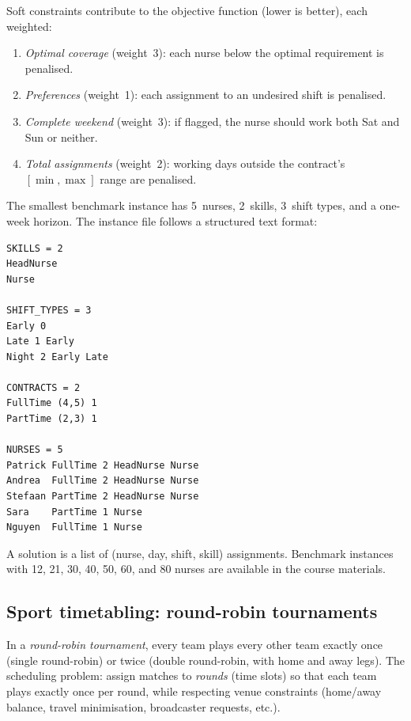 \noindent
Soft constraints contribute to the objective function
(lower is better), each weighted:
\begin{enumerate}[nosep]
  \item[S1.] \emph{Optimal coverage} (weight~3):
             each nurse below the optimal requirement is penalised.
  \item[S2.] \emph{Preferences} (weight~1):
             each assignment to an undesired shift is penalised.
  \item[S3.] \emph{Complete weekend} (weight~3):
             if flagged, the nurse should work both Sat and Sun or
             neither.
  \item[S4.] \emph{Total assignments} (weight~2):
             working days outside the contract's $[\min, \max]$
             range are penalised.
\end{enumerate}

\begin{example}
\label{ex:nr-05}
The smallest benchmark instance has 5~nurses, 2~skills, 3~shift
types, and a one-week horizon.  The instance file follows a
structured text format:

\begin{lstlisting}[language={}, numbers=none,
  caption={Excerpt from the NR-05 instance file.}]
SKILLS = 2
HeadNurse
Nurse

SHIFT_TYPES = 3
Early 0
Late 1 Early
Night 2 Early Late

CONTRACTS = 2
FullTime (4,5) 1
PartTime (2,3) 1

NURSES = 5
Patrick FullTime 2 HeadNurse Nurse
Andrea  FullTime 2 HeadNurse Nurse
Stefaan PartTime 2 HeadNurse Nurse
Sara    PartTime 1 Nurse
Nguyen  FullTime 1 Nurse
\end{lstlisting}

\noindent
A solution is a list of (nurse, day, shift, skill) assignments.
Benchmark instances with 12, 21, 30, 40, 50, 60, and 80 nurses
are available in the course materials.%
\end{example}


\subsection{Sport timetabling: round-robin tournaments}
\label{ssec:sport-timetabling}

In a \emph{round-robin tournament}, every team plays every
other team exactly once (single round-robin) or twice
(double round-robin, with home and away legs).
The scheduling problem: assign matches to \emph{rounds}
(time slots) so that each team plays exactly once per round,
while respecting venue constraints (home/away balance, travel
minimisation, broadcaster requests, etc.).

